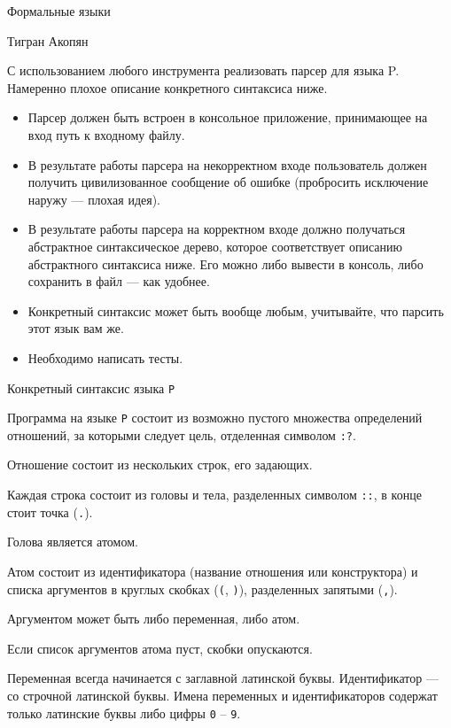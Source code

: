 \documentclass[12pt]{article}
\begin{document}
\begin{center}
{\LARGE Формальные языки}

\bigskip

{\Large Тигран Акопян}
\end{center}

\bigskip

С использованием любого инструмента реализовать парсер для языка P. Намеренно плохое описание конкретного синтаксиса ниже.

\begin{itemize}
  \item Парсер должен быть встроен в консольное приложение, принимающее на вход путь к входному файлу.
  \item В результате работы парсера на некорректном входе пользователь должен получить цивилизованное сообщение об ошибке (пробросить исключение наружу --- плохая идея).
  \item В результате работы парсера на корректном входе должно получаться абстрактное синтаксическое дерево, которое соответствует описанию абстрактного синтаксиса ниже. Его можно либо вывести в консоль, либо сохранить в файл --- как удобнее.
  \item Конкретный синтаксис может быть вообще любым, учитывайте, что парсить этот язык вам же.
  \item Необходимо написать тесты.
\end{itemize}

\begin{center}
    \Large{Конкретный синтаксис языка \verb!P!}
\end{center}

Программа на языке \verb!P! состоит из возможно пустого множества определений отношений, за которыми следует цель, отделенная символом \verb!:?!.

Отношение состоит из нескольких строк, его задающих.

Каждая строка состоит из головы и тела, разделенных символом \verb!::!, в конце стоит точка (\verb!.!).

Голова является атомом.

Атом состоит из идентификатора (название отношения или конструктора) и списка аргументов в круглых скобках (\verb!(!, \verb!)!), разделенных запятыми (\verb!,!).

Аргументом может быть либо переменная, либо атом.

Если список аргументов атома пуст, скобки опускаются.

Переменная всегда начинается с заглавной латинской буквы. Идентификатор --- со строчной латинской буквы.
Имена переменных и идентификаторов содержат только латинские буквы либо цифры \verb!0! -- \verb!9!.
\end{document}
